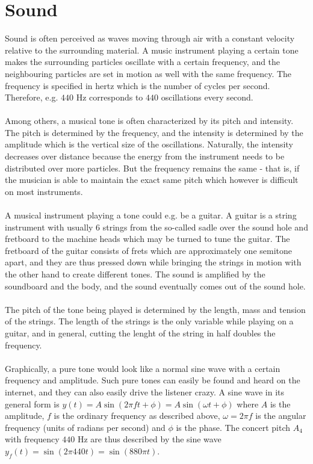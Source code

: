 \section{Sound}
Sound is often perceived as waves moving through air with a constant velocity relative to the surrounding material. A music instrument playing a certain tone makes the surrounding particles oscillate with a certain frequency, and the neighbouring particles are set in motion as well with the same frequency. The frequency is specified in hertz which is the number of cycles per second. Therefore, e.g. $440$ Hz corresponds to $440$ oscillations every second.
\\ \\
Among others, a musical tone is often characterized by its pitch and intensity. The pitch is determined by the frequency, and the intensity is determined by the amplitude which is the vertical size of the oscillations. Naturally, the intensity decreases over distance because the energy from the instrument needs to be distributed over more particles. But the frequency remains the same - that is, if the musician is able to maintain the exact same pitch which however is difficult on most instruments.
\\ \\
A musical instrument playing a tone could e.g. be a guitar. A guitar is a string instrument with usually 6 strings from the so-called sadle over the sound hole and fretboard to the machine heads which may be turned to tune the guitar. The fretboard of the guitar consists of frets which are approximately one semitone apart, and they are thus pressed down while bringing the strings in motion with the other hand to create different tones. The sound is amplified by the soundboard and the body, and the sound eventually comes out of the sound hole. \cite{WikiGuitar}
\\ \\
The pitch of the tone being played is determined by the length, mass and tension of the strings. The length of the strings is the only variable while playing on a guitar, and in general, cutting the lenght of the string in half doubles the frequency. \cite{AcousticGuitar} 
\\ \\
Graphically, a pure tone would look like a normal sine wave with a certain frequency and amplitude. Such pure tones can easily be found and heard on the internet, and they can also easily drive the listener crazy. A sine wave in its general form is $y(t) = A\sin(2\pi f t + \phi) = A\sin(\omega t + \phi)$ where $A$ is the amplitude, $f$ is the ordinary frequency as described above, $\omega = 2 \pi f$ is the angular frequency (units of radians per second) and $\phi$ is the phase. \cite{SineWave} The concert pitch $A_4$ with frequency $440$ Hz are thus described by the sine wave $y_f(t) = \sin(2 \pi 440 t) = \sin(880 \pi t)$. \\
